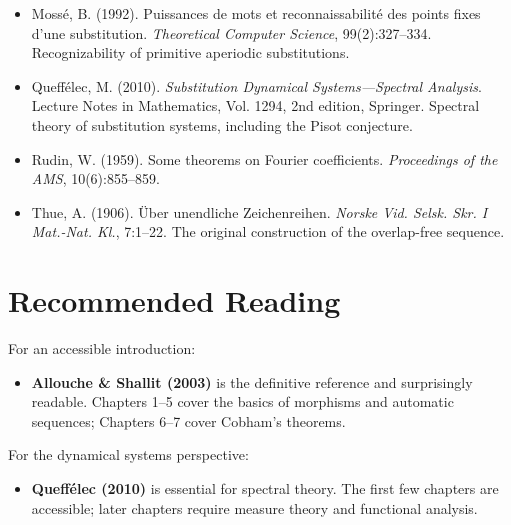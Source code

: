 \begin{itemize}
\item Mossé, B. (1992). Puissances de mots et reconnaissabilité des points fixes d'une substitution. \textit{Theoretical Computer Science}, 99(2):327--334. Recognizability of primitive aperiodic substitutions.
\end{itemize}

\begin{itemize}
\item Queffélec, M. (2010). \textit{Substitution Dynamical Systems---Spectral Analysis}. Lecture Notes in Mathematics, Vol. 1294, 2nd edition, Springer. Spectral theory of substitution systems, including the Pisot conjecture.
\end{itemize}

\begin{itemize}
\item Rudin, W. (1959). Some theorems on Fourier coefficients. \textit{Proceedings of the AMS}, 10(6):855--859.
\end{itemize}

\begin{itemize}
\item Thue, A. (1906). Über unendliche Zeichenreihen. \textit{Norske Vid. Selsk. Skr. I Mat.-Nat. Kl.}, 7:1--22. The original construction of the overlap-free sequence.
\end{itemize}



\section{Recommended Reading}

For an accessible introduction:

\begin{itemize}
\item \textbf{Allouche \& Shallit (2003)} is the definitive reference and surprisingly readable. Chapters 1--5 cover the basics of morphisms and automatic sequences; Chapters 6--7 cover Cobham's theorems.
\end{itemize}

For the dynamical systems perspective:

\begin{itemize}
\item \textbf{Queffélec (2010)} is essential for spectral theory. The first few chapters are accessible; later chapters require measure theory and functional analysis.
\end{itemize}

